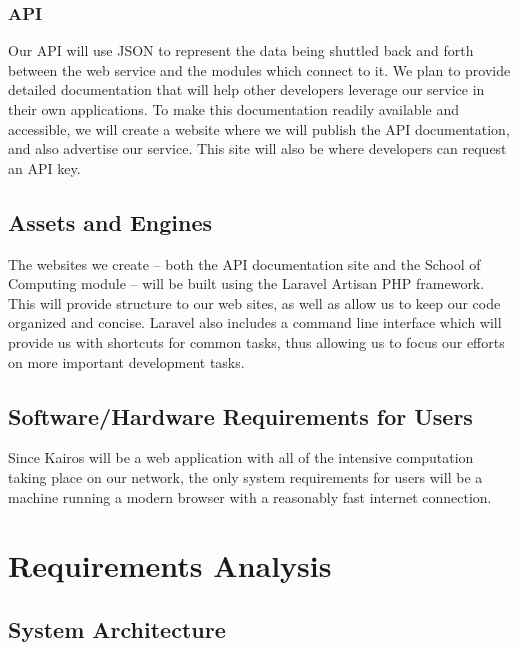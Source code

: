 \documentclass{extarticle}
\begin{document}
\subsubsection{API}
Our API will use JSON to represent the data being shuttled back and forth between the web service and the modules
which connect to it.  We plan to provide detailed documentation that will help other developers leverage our
service in their own applications.  To make this documentation readily available and accessible, we will create a
website where we will publish the API documentation, and also advertise our service.  This site will also be where
developers can request an API key.

\subsection{Assets and Engines}
The websites we create -- both the API documentation site and the School of Computing module -- will be built using
the Laravel Artisan PHP framework.  This will provide structure to our web sites, as well as allow us to keep our
code organized and concise.  Laravel also includes a command line interface which will provide us with shortcuts
for common tasks, thus allowing us to focus our efforts on more important development tasks.

\subsection{Software/Hardware Requirements for Users}
Since Kairos will be a web application with all of the intensive computation taking place on our network, the only
system requirements for users will be a machine running a modern browser with a reasonably fast internet connection.

\section{Requirements Analysis}

\subsection{System Architecture}
\end{document}
